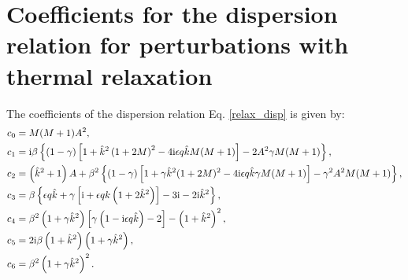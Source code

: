 
\section{Coefficients for the dispersion relation for perturbations
with thermal relaxation}\label{relax_coeff}
The coefficients of the dispersion relation Eq. \ref{relax_disp} is
given by:
\begin{align}
  &c_0 = M(M+1)A^2,\\
  &c_1 = \mathrm{i}\beta\left\{\left(1-\gamma\right)\left[1 +
      \hat{k}^2\left(1+2M\right)^2 - 4 \mathrm{i}\epsilon q\hat{k} M (M+1)\right] 
    - 2A^2\gamma M (M+1)\right\},\\
  &c_2 = \left(\hat{k}^2 + 1\right)A + \beta^2\left\{(1-\gamma)\left[1
      + \gamma \hat{k}^2(1+2M)^2 - 4\mathrm{i}\epsilon q \hat{k} \gamma M(M+1)
    \right]
    -\gamma^2 A^2 M(M+1)
  \right\},\\
  &c_3 = \beta\left\{\epsilon q \hat{k} + \gamma \left[\mathrm{i} + \epsilon q
      k \left(1+2\hat{k}^2\right)\right] - 3\mathrm{i} - 2\mathrm{i}
    \hat{k}^2\right\},\\
  &c_4 =
  \beta^2\left(1+\gamma\hat{k}^2\right)\left[\gamma\left(1-\mathrm{i}\epsilon q
    \hat{k}\right)-2\right] - \left(1+\hat{k}^2\right)^2,\\
&c_5 = 2\mathrm{i}\beta\left(1+\hat{k}^2\right)\left(1+\gamma\hat{k}^2\right),\\
&c_6 = \beta^2\left(1+\gamma\hat{k}^2\right)^2.
\end{align}

